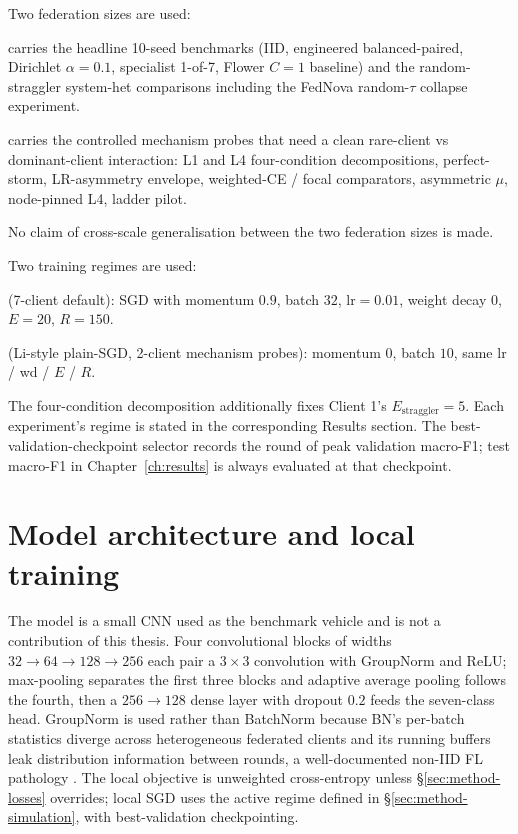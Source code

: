 \documentclass[11pt,a4paper]{report}
\begin{document}
Two federation sizes are used:
\begin{description}
  \setlength{\itemsep}{2pt}
  \item[7-client federation] carries the headline 10-seed benchmarks
    (IID, engineered balanced-paired, Dirichlet $\alpha = 0.1$,
    specialist 1-of-7, Flower $C = 1$ baseline) and the random-straggler
    system-het comparisons including the FedNova random-$\tau$ collapse
    experiment.
  \item[2-client federation] carries the controlled mechanism probes
    that need a clean rare-client vs dominant-client interaction: L1
    and L4 four-condition decompositions, perfect-storm, LR-asymmetry
    envelope, weighted-CE / focal comparators, asymmetric $\mu$,
    node-pinned L4, ladder pilot.
\end{description}
No claim of cross-scale generalisation between the two federation sizes
is made.

Two training regimes are used:
\begin{description}
  \setlength{\itemsep}{2pt}
  \item[Regime A] (7-client default): SGD with momentum $0.9$, batch
    $32$, $\textrm{lr} = 0.01$, weight decay $0$, $E = 20$, $R = 150$.
  \item[Regime B] (Li-style plain-SGD, 2-client mechanism probes):
    momentum $0$, batch $10$, same lr / wd / $E$ / $R$.
\end{description}
The four-condition decomposition additionally fixes Client 1's
$E_{\textrm{straggler}} = 5$. Each experiment's regime is stated in
the corresponding Results section. The best-validation-checkpoint
selector records the round of peak validation macro-F1; test macro-F1
in Chapter~\ref{ch:results} is always evaluated at that checkpoint.

\section{Model architecture and local training}
\label{sec:method-model}

The model is a small CNN used as the benchmark vehicle and is not a
contribution of this thesis. Four convolutional blocks of widths
$32 \to 64 \to 128 \to 256$ each pair a $3 \times 3$ convolution with
GroupNorm \citep{wu2018groupnorm} and ReLU; max-pooling separates the
first three blocks and adaptive average pooling follows the fourth, then
a $256 \to 128$ dense layer with dropout $0.2$ feeds the seven-class
head. GroupNorm is used rather than BatchNorm because BN's per-batch
statistics diverge across heterogeneous federated clients and its
running buffers leak distribution information between rounds, a
well-documented non-IID FL pathology \citep{hsieh2020quagmire}. The local objective is
unweighted cross-entropy unless §\ref{sec:method-losses} overrides;
local SGD uses the active regime defined in
§\ref{sec:method-simulation}, with best-validation checkpointing.
\end{document}
